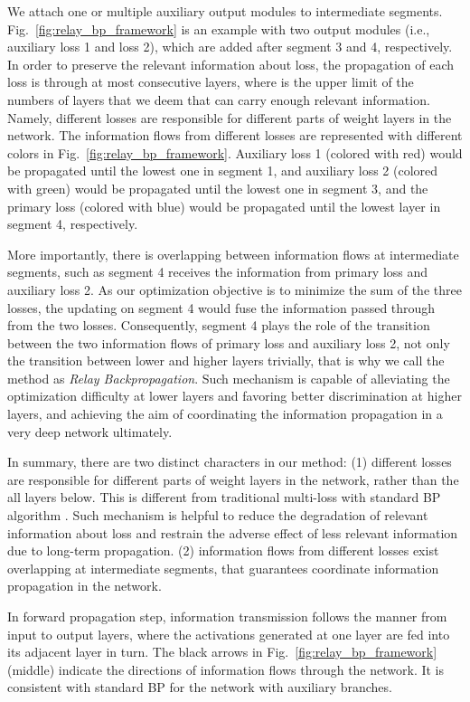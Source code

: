 \documentclass[runningheads]{llncs}
\begin{document}
We attach one or multiple auxiliary output modules to intermediate segments. Fig.~\ref{fig:relay_bp_framework} is an example with two output modules (i.e., auxiliary loss 1 and loss 2), which are added after segment 3 and 4, respectively. In order to preserve the relevant information about loss, the propagation of each loss is through at most  consecutive layers, where  is the upper limit of the numbers of layers that we deem that can carry enough relevant information. Namely, different losses are responsible for different parts of weight layers in the network. The information flows from different losses are represented with different colors in Fig.~\ref{fig:relay_bp_framework}. Auxiliary loss 1 (colored with red) would be propagated until the lowest one in segment 1, and auxiliary loss 2 (colored with green) would be propagated until the lowest one in segment 3, and the primary loss (colored with blue) would be propagated until the lowest layer in segment 4, respectively.

More importantly, there is overlapping between information flows at intermediate segments, such as segment 4 receives the information from primary loss and auxiliary loss 2. As our optimization objective is to minimize the sum of the three losses, the updating on segment 4 would fuse the information passed through from the two losses. Consequently, segment 4 plays the role of the transition between the two information flows of primary loss and auxiliary loss 2, not only the transition between lower and higher layers trivially, that is why we call the method as {\it Relay Backpropagation}. Such mechanism is capable of alleviating the optimization difficulty at lower layers and favoring better discrimination at higher layers, and achieving the aim of coordinating the information propagation in a very deep network ultimately.

In summary, there are two distinct characters in our method: (1) different losses are responsible for different parts of weight layers in the network, rather than the all layers below. This is different from traditional multi-loss with standard BP algorithm \cite{lee_2015,szegedy_cvpr2015}. Such mechanism is helpful to reduce the degradation of relevant information about loss and restrain the adverse effect of less relevant information due to long-term propagation. (2) information flows from different losses exist overlapping at intermediate segments, that guarantees coordinate information propagation in the network.

In forward propagation step, information transmission follows the manner from input to output layers, where the activations generated at one layer are fed into its adjacent layer in turn. The black arrows in Fig.~\ref{fig:relay_bp_framework} (middle) indicate the directions of information flows through the network. It is consistent with standard BP for the network with auxiliary branches.
\end{document}
